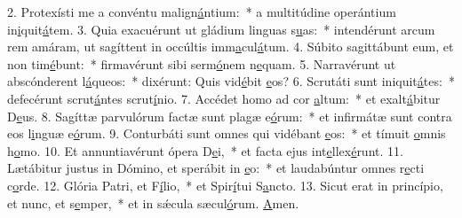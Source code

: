 2. Protexísti me a convéntu malign\uline{á}ntium:~* a multitúdine operántium in\uline{i}quit\uline{á}tem.
3. Quia exacuérunt ut gládium linguas s\uline{u}as:~* intendérunt arcum rem amáram, ut sagíttent in occúltis imm\uline{a}cul\uline{á}tum.
4. Súbito sagittábunt eum, et non tim\uline{é}bunt:~* firmavérunt sibi serm\uline{ó}nem n\uline{e}quam.
5. Narravérunt ut abscónderent l\uline{á}queos:~* dixérunt: Quis vid\uline{é}bit \uline{e}os?
6. Scrutáti sunt iniquit\uline{á}tes:~* defecérunt scrut\uline{á}ntes scrut\uline{í}nio.
7. Accédet homo ad cor \uline{a}ltum:~* et exalt\uline{á}bitur D\uline{e}us.
8. Sagíttæ parvulórum factæ sunt plagæ e\uline{ó}rum:~* et infirmátæ sunt contra eos l\uline{i}nguæ e\uline{ó}rum.
9. Conturbáti sunt omnes qui vidébant \uline{e}os:~* et tímuit \uline{o}mnis h\uline{o}mo.
10. Et annuntiavérunt ópera D\uline{e}i,~* et facta ejus int\uline{e}llex\uline{é}runt.
11. Lætábitur justus in Dómino, et sperábit in \uline{e}o:~* et laudabúntur omnes r\uline{e}cti c\uline{o}rde.
12. Glória Patri, et F\uline{í}lio,~* et Spir\uline{í}tui S\uline{a}ncto.
13. Sicut erat in princípio, et nunc, et s\uline{e}mper,~* et in sǽcula sæcul\uline{ó}rum. \uline{A}men.
